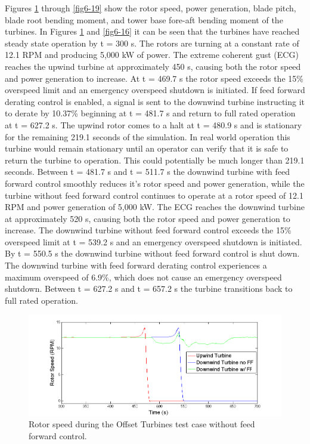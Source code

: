 Figures \ref{fig6-15} through \ref{fig6-19} show the rotor speed, power generation, blade pitch, blade root bending moment, and tower base fore-aft bending moment of the turbines. In Figures \ref{fig6-15} and \ref{fig6-16} it can be seen that the turbines have reached steady state operation by t = 300 s. The rotors are turning at a constant rate of 12.1 RPM and  producing 5,000 kW of power. The extreme coherent gust (ECG) reaches the upwind turbine at approximately 450 s, causing both the rotor speed and power generation to increase. At t = 469.7 s the rotor speed exceeds the 15\% overspeed limit and an emergency overspeed shutdown is initiated. If feed forward derating control is enabled, a signal is sent to the downwind turbine instructing it to derate by 10.37\% beginning at t = 481.7 s and return to full rated operation at t = 627.2 s. The upwind rotor comes to a halt at t = 480.9 s and is stationary for the remaining 219.1 seconds of the simulation. In real world operation this turbine would remain stationary until an operator can verify that it is safe to return the turbine to operation. This could potentially be much longer than 219.1 seconds. Between t = 481.7 s and t = 511.7 s the downwind turbine with feed forward control smoothly reduces it's rotor speed and power generation, while the turbine without feed forward control continues to operate at a rotor speed of 12.1 RPM and power generation of 5,000 kW. The ECG reaches the downwind turbine at approximately 520 s, causing both the rotor speed and power generation to increase. The downwind turbine without feed forward control exceeds the 15\% overspeed limit at t = 539.2 s and an emergency overspeed shutdown is initiated. By t = 550.5 s the downwind turbine without feed forward control is shut down. The downwind turbine with feed forward derating control experiences a maximum overspeed of 6.9\%, which does not cause an emergency overspeed shutdown. Between t = 627.2 s and t = 657.2 s the turbine transitions back to full rated operation.

\begin{figure}[ht] 
	\centering
		\includegraphics[width = \linewidth]{Figures/ch6Figures/fig6-15.png}

	\caption{Rotor speed during the Offset Turbines test case without feed forward control.}
	\label{fig6-15}
\end{figure}


